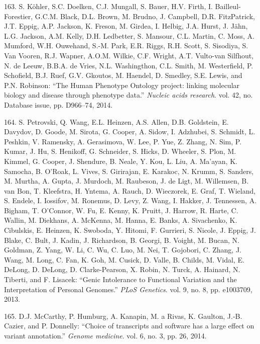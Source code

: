 \documentclass[12pt,a4paper,twoside]{ugathesis}
\theoremstyle{definition}
\theoremstyle{definition}
\theoremstyle{definition}
\theoremstyle{remark}
\begin{document}
\hypertarget{ref-Kohler2014}{}
163. S. Köhler, S.C. Doelken, C.J. Mungall, S. Bauer, H.V. Firth, I.
Bailleul-Forestier, G.C.M. Black, D.L. Brown, M. Brudno, J. Campbell,
D.R. FitzPatrick, J.T. Eppig, A.P. Jackson, K. Freson, M. Girdea, I.
Helbig, J.A. Hurst, J. Jähn, L.G. Jackson, A.M. Kelly, D.H. Ledbetter,
S. Mansour, C.L. Martin, C. Moss, A. Mumford, W.H. Ouwehand, S.-M. Park,
E.R. Riggs, R.H. Scott, S. Sisodiya, S. Van Vooren, R.J. Wapner, A.O.M.
Wilkie, C.F. Wright, A.T. Vulto-van Silfhout, N. de Leeuw, B.B.A. de
Vries, N.L. Washingthon, C.L. Smith, M. Westerfield, P. Schofield, B.J.
Ruef, G.V. Gkoutos, M. Haendel, D. Smedley, S.E. Lewis, and P.N.
Robinson: ``The Human Phenotype Ontology project: linking molecular
biology and disease through phenotype data.'' \emph{Nucleic acids
research}. vol. 42, no. Database issue, pp. D966--74, 2014.

\hypertarget{ref-Petrovski2013}{}
164. S. Petrovski, Q. Wang, E.L. Heinzen, A.S. Allen, D.B. Goldstein, E.
Davydov, D. Goode, M. Sirota, G. Cooper, A. Sidow, I. Adzhubei, S.
Schmidt, L. Peshkin, V. Ramensky, A. Gerasimova, W. Lee, P. Yue, Z.
Zhang, N. Sim, P. Kumar, J. Hu, S. Henikoff, G. Schneider, S. Hicks, D.
Wheeler, S. Plon, M. Kimmel, G. Cooper, J. Shendure, B. Neale, Y. Kou,
L. Liu, A. Ma'ayan, K. Samocha, B. O'Roak, L. Vives, S. Girirajan, E.
Karakoc, N. Krumm, S. Sanders, M. Murtha, A. Gupta, J. Murdoch, M.
Raubeson, J. de Ligt, M. Willemsen, B. van Bon, T. Kleefstra, H. Yntema,
A. Rauch, D. Wieczorek, E. Graf, T. Wieland, S. Endele, I. Iossifov, M.
Ronemus, D. Levy, Z. Wang, I. Hakker, J. Tennessen, A. Bigham, T.
O'Connor, W. Fu, E. Kenny, K. Pruitt, J. Harrow, R. Harte, C. Wallin, M.
Diekhans, A. McKenna, M. Hanna, E. Banks, A. Sivachenko, K. Cibulskis,
E. Heinzen, K. Swoboda, Y. Hitomi, F. Gurrieri, S. Nicole, J. Eppig, J.
Blake, C. Bult, J. Kadin, J. Richardson, B. Georgi, B. Voight, M. Bucan,
N. Goldman, Z. Yang, W. Li, C. Wu, C. Luo, M. Nei, T. Gojobori, C.
Zhang, J. Wang, M. Long, C. Fan, K. Goh, M. Cusick, D. Valle, B. Childs,
M. Vidal, E. DeLong, D. DeLong, D. Clarke-Pearson, X. Robin, N. Turck,
A. Hainard, N. Tiberti, and F. Lisacek: ``Genic Intolerance to
Functional Variation and the Interpretation of Personal Genomes.''
\emph{PLoS Genetics}. vol. 9, no. 8, pp. e1003709, 2013.

\hypertarget{ref-McCarthy2014}{}
165. D.J. McCarthy, P. Humburg, A. Kanapin, M. a Rivas, K. Gaulton,
J.-B. Cazier, and P. Donnelly: ``Choice of transcripts and software has
a large effect on variant annotation.'' \emph{Genome medicine}. vol. 6,
no. 3, pp. 26, 2014.
\end{document}
